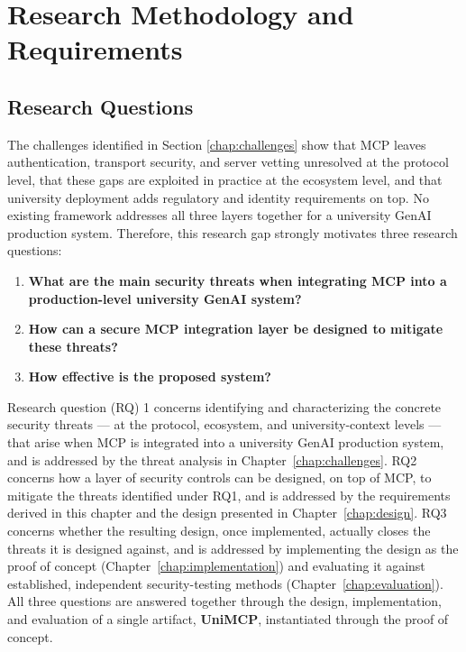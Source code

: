 \documentclass[english, 12pt, a4paper, elec, utf8, a-2b, online]{aaltothesis}
\newcommand{\UniMCP}{\textbf{UniMCP}\xspace}
\newcommand{\aitutor}{\text{AI Tutor}\xspace}
\begin{document}
\clearpage
\section{Research Methodology and Requirements}
\label{chap:requirements}

\subsection{Research Questions}

The challenges identified in Section \ref{chap:challenges} show that MCP leaves authentication, transport security, and server vetting unresolved at the protocol level, that these gaps are exploited in practice at the ecosystem level, and that university deployment adds regulatory and identity requirements on top. No existing framework addresses all three layers together for a university GenAI production system. Therefore, this research gap strongly motivates three research questions:
 
\begin{enumerate}
    \item \textbf{What are the main security threats when integrating MCP into a production-level university GenAI system?}
    \item \textbf{How can a secure MCP integration layer be designed to mitigate these threats?}
    \item \textbf{How effective is the proposed system?}
\end{enumerate}
 
Research question (RQ) 1 concerns identifying and characterizing the concrete security threats --- at the protocol, ecosystem, and university-context levels --- that arise when MCP is integrated into a university GenAI production system, and is addressed by the threat analysis in Chapter~\ref{chap:challenges}.
RQ2 concerns how a layer of security controls can be designed, on top of MCP, to mitigate the threats identified under RQ1, and is addressed by the requirements derived in this chapter and the design presented in Chapter~\ref{chap:design}.
RQ3 concerns whether the resulting design, once implemented, actually closes the threats it is designed against, and is addressed by implementing the design as the \aitutor proof of concept (Chapter~\ref{chap:implementation}) and evaluating it against established, independent security-testing methods (Chapter~\ref{chap:evaluation}).
All three questions are answered together through the design, implementation, and evaluation of a single artifact, \UniMCP, instantiated through the \aitutor proof of concept.
\end{document}
